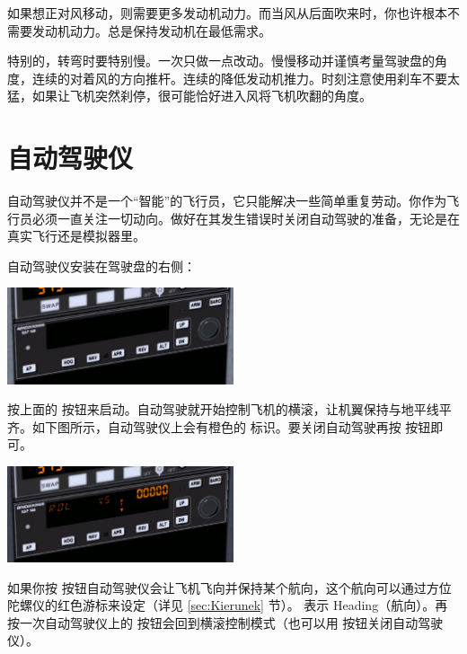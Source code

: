 \begin{itemize}
如果想正对风移动，则需要更多发动机动力。而当风从后面吹来时，你也许根本不需要发动机动力。总是保持发动机在最低需求。

特别的，转弯时要特别慢。一次只做一点改动。慢慢移动并谨慎考量驾驶盘的角度，连续的对着风的方向推杆。连续的降低发动机推力。时刻注意使用刹车不要太猛，如果让飞机突然刹停，很可能恰好进入风将飞机吹翻的角度。

\section{自动驾驶仪}
\label{sec:Autopilot}

自动驾驶仪并不是一个“智能”的飞行员，它只能解决一些简单重复劳动。你作为飞行员必须一直关注一切动向。做好在其发生错误时关闭自动驾驶的准备，无论是在真实飞行还是模拟器里。

自动驾驶仪安装在驾驶盘的右侧：

\begin{center}
\includegraphics[width=0.5\textwidth]{img/tut_49}
\end{center}

按上面的  按钮来启动。自动驾驶就开始控制飞机的横滚，让机翼保持与地平线平齐。如下图所示，自动驾驶仪上会有橙色的 \textcolor{orange}{} 标识。要关闭自动驾驶再按  按钮即可。

\begin{center}
\includegraphics[width=0.5\textwidth]{img/tut_50}
\end{center}

如果你按  按钮自动驾驶仪会让飞机飞向并保持某个航向，这个航向可以通过方位陀螺仪的红色游标来设定（详见 \ref{sec:Kierunek} 节）。\textcolor{orange}{} 表示 Heading（航向）。再按一次自动驾驶仪上的  按钮会回到横滚控制模式（也可以用  按钮关闭自动驾驶仪）。


\end{itemize}
